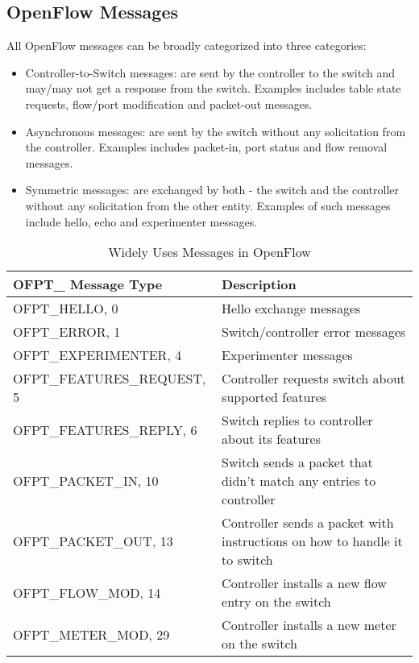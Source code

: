 \documentclass[a4paper]{article}
\begin{document}
\subsection{OpenFlow Messages}
All OpenFlow messages can be broadly categorized into three categories:
\begin{itemize}
\item Controller-to-Switch messages: are sent by the controller to the switch and may/may not get a response from the switch. Examples includes table state requests, flow/port modification and packet-out messages.
\item Asynchronous messages: are sent by the switch without any solicitation from the controller. Examples includes packet-in, port status and flow removal messages.
\item Symmetric messages: are exchanged by both - the switch and the controller without any solicitation from the other entity. Examples of such messages include hello, echo and experimenter messages.
\end{itemize}

\begin{table}[h!]
\centering
\begin{center}
\begin{tabular} {| p{5.3cm} | p{11cm} |} %
\hline
\textbf{OFPT\_ Message Type} & \textbf{Description} \\ \hline
OFPT\_HELLO, 0 & Hello exchange messages \\
OFPT\_ERROR, 1 & Switch/controller error messages \\
OFPT\_EXPERIMENTER, 4 & Experimenter messages \\
OFPT\_FEATURES\_REQUEST, 5 & Controller requests switch about supported features \\
OFPT\_FEATURES\_REPLY, 6 & Switch replies to controller about its features \\
OFPT\_PACKET\_IN, 10 & Switch sends a packet that didn't match any entries to controller \\
OFPT\_PACKET\_OUT, 13 & Controller sends a packet with instructions on how to handle it to switch \\
OFPT\_FLOW\_MOD, 14 & Controller installs a new flow entry on the switch \\
OFPT\_METER\_MOD, 29 & Controller installs a new meter on the switch \\
\hline
\end{tabular}
\caption{Widely Uses Messages in OpenFlow}
\label{table:of_msg_types}
\end{center}
\end{table}
\end{document}
